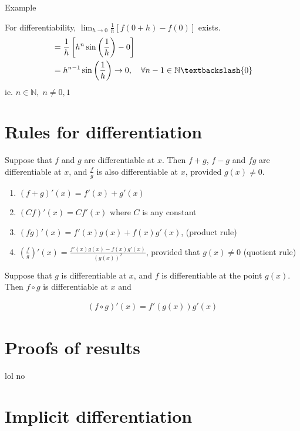 \documentclass{report}
\begin{document}
\begin{question}{Example}
\begin{enumerate}
					For differentiability, $\displaystyle\lim_{h\to 0} \frac{1}{h} \left[f(0+h) - f(0) \right]$ exists.
					\begin{align*}
						&= \frac{1}{h} \left[ h^n \sin\left(\frac{1}{h}\right) - 0 \right]	\\
						&= h^{n-1} \sin \left(\frac{1}{h}\right) \rightarrow 0, \quad \forall n-1 \in \mathbb{N} \textbackslash \{0\}
					\end{align*}
					ie. $n \in \mathbb{N}, \; n \neq 0, 1$
			\end{enumerate}
		\end{question}

	\section{Rules for differentiation}
			
		Suppose that $f$ and $g$ are differentiable at $x$. Then $f+g$, $f-g$ and $fg$ are differentiable at $x$, and $\frac{f}{g}$ is also differentiable at $x$, provided $g(x) \neq 0$.

			\begin{enumerate}
				\item $(f+g)'(x) = f'(x) + g'(x)$
				\item $(Cf)'(x) = Cf'(x)$ where $C$ is any constant
				\item $(fg)'(x) = f'(x)g(x) + f(x)g'(x)$, (product rule)
				\item $\left(\frac{f}{g}\right)'(x) = \frac{f'(x)g(x) - f(x)g'(x)}{(g(x))^2}$, provided that $g(x) \neq 0$ (quotient rule)
			\end{enumerate}

		Suppose that $g$ is differentiable at $x$, and $f$ is differentiable at the point $g(x)$. Then $f \circ g$ is differentiable at $x$ and
		
		\begin{align*}
			(f \circ g)'(x) = f'(g(x))g'(x)
		\end{align*}

	\section{Proofs of results}
		
		lol no

	\section{Implicit differentiation}
\end{document}
